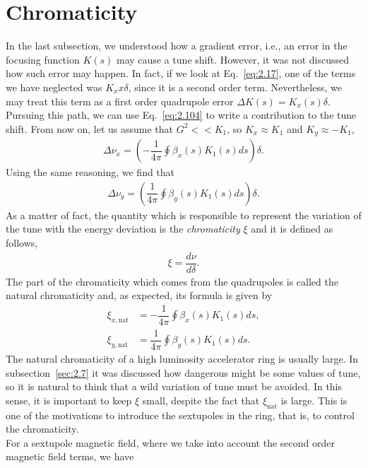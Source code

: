 \section{Chromaticity}

In the last subsection, we understood how a gradient error, i.e., an error in the focusing function $K(s)$ may cause a tune shift. However, it was not discussed how such error may happen. In fact, if we look at Eq.~\eqref{eq:2.17}, one of the terms we have neglected was $K_x x \delta$, since it is a second order term. Nevertheless, we may treat this term as a first order quadrupole error $\Delta K(s) = K_x(s) \delta$. Pursuing this path, we can use Eq.~\eqref{eq:2.104} to write a contribution to the tune shift. From now on, let us assume that ${G^2 << K_1}$, so $K_x \approx K_1$ and $K_y \approx -K_1$,
\begin{align}\label{eq:Dnux_delta}
	\Delta\nu_x = \left( -\dfrac{1}{4\pi}\oint\beta_x(s) K_1(s)ds \right) \delta.
\end{align}
Using the same reasoning, we find that
\begin{align}\label{eq:Dnuy_delta}
	\Delta\nu_y = \left( \dfrac{1}{4\pi}\oint\beta_y(s) K_1(s)ds \right) \delta.
\end{align}
As a matter of fact, the quantity which is responsible to represent the variation of the tune with the energy deviation is the \emph{chromaticity} $\xi$ and it is defined as follows,
\begin{align}
	\xi = \dfrac{d\nu}{d\delta}.	
\end{align}
The part of the chromaticity which comes from the quadrupoles is called the natural chromaticity and, as expected, its formula is given by
\begin{align}
	\xi_{x,\text{nat}} &= -\dfrac{1}{4\pi}\oint\beta_x(s) K_1(s)ds,\\
   	\xi_{y,\text{nat}} &= \dfrac{1}{4\pi}\oint\beta_y(s) K_1(s)ds.
\end{align}
The natural chromaticity of a high luminosity accelerator ring is usually large. In subsection~\ref{sec:2.7} it was discussed how dangerous might be some values of tune, so it is natural to think that a wild variation of tune must be avoided. In this sense, it is important to keep $\xi$ small, despite the fact that $\xi_\text{nat}$ is large. This is one of the motivations to introduce the sextupoles in the ring, that is, to control the chromaticity.\\
For a sextupole magnetic field, where we take into account the second order magnetic field terms, we have

